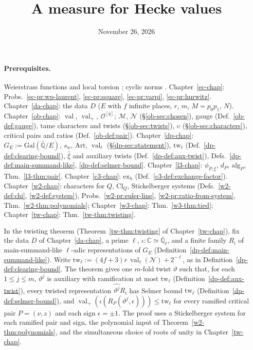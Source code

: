 \documentclass[reqno]{amsart}
\title{A measure for Hecke values}
\author{}
\date{November 26, 2026}
\newcounter{chap}
\theoremstyle{definition}
\theoremstyle{plain}
\theoremstyle{remark}
\newcommand{\Q}{\mathbb{Q}}
\newcommand{\C}{\mathbb{C}}
\newcommand{\Ql}{\bar{\mathbb{Q}}_\ell}
\newcommand{\Oc}{\mathcal{O}}
\newcommand{\Mcal}{\mathcal{M}}
\newcommand{\Nc}{\mathcal{N}}
\newcommand{\alg}{\mathrm{alg}}
\newcommand{\Cl}{\mathrm{Cl}}
\newcommand{\val}{\operatorname{val}}
\begin{document}
\maketitle
{}\label{chap}

\paragraph{Prerequisites.}
Weierstrass functions and local torsion \cite[Thm.~VII.3.4, Prop.~VII.4.1]{Si1}; cyclic norms \cite{La}.  Chapter~\ref{ec-chap}: Probs.~\ref{ec-pr:wp-laurent}, \ref{ec-pr:square}, \ref{ec-pr:varpi}, \ref{ec-pr:hurwitz}.  Chapter~\ref{da-chap}: the data \(D\) (\(E\) with \(f\) infinite places, \(r\), \(m\), \(M = p_0p_1\), \(N\)).  Chapter~\ref{ob-chap}: \(\val\), \(\val_+\), \(\Oc^{[q]}\); \(\Mcal\), \(\Nc\) (\S\ref{ob-sec:chosen}), gauge (Def.~\ref{ob-def:gauge}), tame characters and twists (\S\ref{ob-sec:twists}), \(\upsilon\) (\S\ref{ob-sec:characters}), critical pairs and ratios (Def.~\ref{ob-def:pair}).  Chapter~\ref{dp-chap}: \(G_E := \mathrm{Gal}(\bar{\Q}/E)\), \(s_w\), \(\mathrm{Art}\), \(\val_\ell\) (\S\ref{dp-sec:statement}), \(\mathrm{tw}_\ell\) (Def.~\ref{dp-def:clearing-bound}), \(\hat\xi\) and auxiliary twists (Def.~\ref{dp-def:aux-twist}), Defs.~\ref{dp-def:main-summand-like}, \ref{dp-def:selmer-bound}.  Chapter~\ref{l3-chap}: \(\phi_{P,\xi}\), \(d_P\), \(\alg_P\), Thm.~\ref{l3-thm:pair}.  Chapter~\ref{c3-chap}: \(\mathrm{ex}_h\) (Def.~\ref{c3-def:exchange-factor}).  Chapter~\ref{w2-chap}: characters for \(Q\), \(\Cl_Q\), Stickelberger systems (Defs.~\ref{w2-def:chi}, \ref{w2-def:system}), Probs.~\ref{w2-pr:euler-line}, \ref{w2-pr:ratio-from-system}, Thm.~\ref{w2-thm:polynomials}; Chapter~\ref{w3-chap}: Thm.~\ref{w3-thm:tied}; Chapter~\ref{tw-chap}: Thm.~\ref{tw-thm:twisting}.

\medskip
In the twisting theorem (Theorem~\ref{tw-thm:twisting} of Chapter~\ref{tw-chap}), fix the data \(D\) of Chapter~\ref{da-chap}, a prime \(\ell\), \(\iota \colon \C \simeq \Ql\), and a finite family \(R_i\) of main-summand-like \(\ell\)-adic representations of \(G_E\) (Definition~\ref{dp-def:main-summand-like}).  Write \(\mathrm{tw}_\ell := (4f + 3)r\,\val_\ell(\Nc) + 2^{-\ell}\), as in Definition~\ref{dp-def:clearing-bound}.  The theorem gives one \(m\)-fold twist \(\vartheta\) such that, for each \(1 \le j \le m\), \(\vartheta^j\) is auxiliary with ramification at most \(\mathrm{tw}_\ell\) (Definition~\ref{dp-def:aux-twist}), every twisted representation \(\widehat{\vartheta^j}R_i\) has Selmer bound \(\mathrm{tw}_\ell\) (Definition~\ref{dp-def:selmer-bound}), and \(\val_+(\iota(R_P(\vartheta^j, \epsilon))) \le \mathrm{tw}_\ell\) for every ramified critical pair \(P = (\nu, z)\) and each sign \(\epsilon = \pm 1\).  The proof uses a Stickelberger system for each ramified pair and sign, the polynomial input of Theorem~\ref{w2-thm:polynomials}, and the simultaneous choice of roots of unity in Chapter~\ref{tw-chap}.
\end{document}
